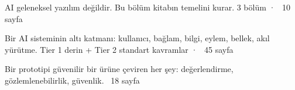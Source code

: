\documentclass[11pt]{book}
\begin{document}
  {AI geleneksel yazılım değildir. Bu bölüm kitabın temelini kurar.}
  {3 bölüm · ~10 sayfa}

  {Bir AI sisteminin altı katmanı: kullanıcı, bağlam, bilgi, eylem, bellek, akıl yürütme.}
  {Tier 1 derin + Tier 2 standart kavramlar · ~45 sayfa}







  {Bir prototipi güvenilir bir ürüne çeviren her şey: değerlendirme, gözlemlenebilirlik, güvenlik.}
  {~18 sayfa}
\end{document}
